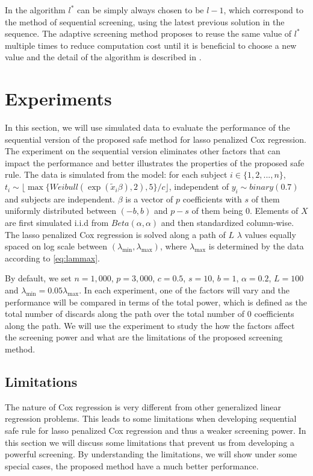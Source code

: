 In the algorithm $l^*$ can be simply always chosen to be $l-1$, which correspond to the method of sequential screening, using the latest previous solution in the sequence. The adaptive screening method proposes to reuse the same value of $l^*$ multiple times to reduce computation cost until it is beneficial to choose a new value and the detail of the algorithm is described in \citep{wang2021adaptive}.

\section{Experiments}

In this section, we will use simulated data to evaluate the performance of the sequential version of the proposed safe method for lasso penalized Cox regression. The experiment on the sequential version eliminates other factors that can impact the performance and better illustrates the properties of the proposed safe rule. The data is simulated from the model: for each subject $i\in\{1,2,...,n\}$, $t_i\sim \lfloor\max\{Weibull(\exp(\tilde{x}_i\beta),2), 5\}/c\rfloor $, independent of $y_i\sim binary(0.7)$ and subjects are independent. $\beta$ is a vector of $p$ coefficients with $s$ of them uniformly distributed between $(-b,b)$ and $p-s$ of them being $0$. Elements of $X$ are first simulated i.i.d from $Beta(\alpha,\alpha)$ and then standardized column-wise. The lasso penalized Cox regression is solved along a path of $L$ $\lambda$ values equally spaced on log scale between $(\lambda_{\min},\lambda_{\max})$, where $\lambda_{\max}$ is determined by the data according to \eqref{eq:lammax}. 

By default, we set $n=1,000$, $p=3,000$, $c=0.5$, $s=10$, $b=1$, $\alpha=0.2$, $L=100$ and $\lambda_{\min}=0.05\lambda_{\max}$. In each experiment, one of the factors will vary and the performance will be compared in terms of the total power, which is defined as the total number of discards along the path over the total number of 0 coefficients along the path. We will use the experiment to study the how the factors affect the screening power and what are the limitations of the proposed screening method.

\subsection{Limitations}
\label{sec:lim}


The nature of Cox regression is very different from other generalized linear regression problems. This leads to some limitations when developing sequential safe rule for lasso penalized Cox regression and thus a weaker screening power. In this section we will discuss some limitations that prevent us from developing a powerful screening. By understanding the limitations, we will show under some special cases, the proposed method have a much better performance.


